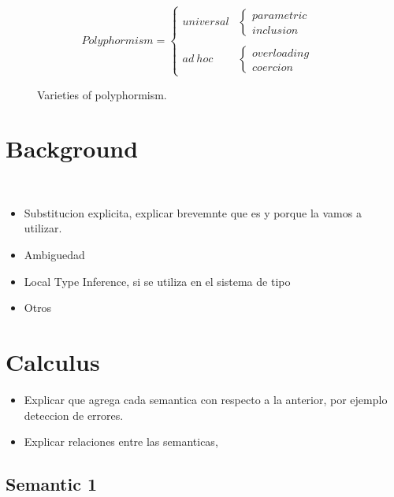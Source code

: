\documentclass{article}
\begin{document}
\begin{itemize}
                                                                    
\end{itemize}
\begin{figure}
\begin{center}
\[ Polyphormism = 
\begin{cases} 
     universal & 
     \begin{cases} 
     	parametric &\\
     	inclusion &
   	\end{cases} \\
		 & \\
     ad \ hoc & 
     \begin{cases} 
     	overloading & \\
     	coercion &
   	\end{cases}
 \end{cases}
\]
\caption{Varieties of polyphormism.}
\label{figure:varpolyphormism}
\end{center}
\end{figure}



\section{Background}\label{section:concepts}\
\begin{itemize}
\item Substitucion explicita, explicar brevemnte que es y porque la vamos a utilizar.
\item Ambiguedad 
\item Local Type Inference, si se utiliza en el sistema de tipo
\item Otros
\end{itemize}
\section{Calculus}\label{section:polymorphism}
\begin{itemize}
\item Explicar que agrega cada semantica con respecto a la anterior, por ejemplo deteccion de errores. 
\item Explicar relaciones entre las semanticas,

\end{itemize}

\subsection{Semantic 1}
\end{document}
